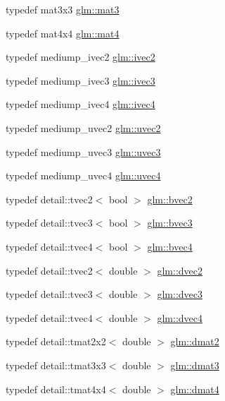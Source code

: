 \begin{DoxyCompactItemize}
\item 
typedef mat3x3 \hyperlink{group__core__types_gadfaff2a7dce5cbf4e77a47ecea42ac5b}{glm\-::mat3}
\item 
typedef mat4x4 \hyperlink{group__core__types_ga7dcd2365c2e368e6af5b7adeb6a9c8df}{glm\-::mat4}
\item 
typedef mediump\-\_\-ivec2 \hyperlink{group__core__types_ga606b9d298d8aaa55c449182c340b4622}{glm\-::ivec2}
\item 
typedef mediump\-\_\-ivec3 \hyperlink{group__core__types_ga620442eba2e3b49317b24fd6d141b0f8}{glm\-::ivec3}
\item 
typedef mediump\-\_\-ivec4 \hyperlink{group__core__types_ga997dbad029105eea19ccd8a1455a6fe3}{glm\-::ivec4}
\item 
typedef mediump\-\_\-uvec2 \hyperlink{group__core__types_gad0643cb47b927024ccf4979b0e9a903d}{glm\-::uvec2}
\item 
typedef mediump\-\_\-uvec3 \hyperlink{group__core__types_ga713379218af0a01d0a7b1e631066106c}{glm\-::uvec3}
\item 
typedef mediump\-\_\-uvec4 \hyperlink{group__core__types_gae85130f09c272fcd64da1353c09dddef}{glm\-::uvec4}
\item 
typedef detail\-::tvec2$<$ bool $>$ \hyperlink{group__core__types_ga0b5729ae4f7b2767a18bb96b7152c072}{glm\-::bvec2}
\item 
typedef detail\-::tvec3$<$ bool $>$ \hyperlink{group__core__types_gac192f5fbd7fcb78ca703d4684f323512}{glm\-::bvec3}
\item 
typedef detail\-::tvec4$<$ bool $>$ \hyperlink{group__core__types_ga8ec34c649bc4513202aff479486bbcea}{glm\-::bvec4}
\item 
typedef detail\-::tvec2$<$ double $>$ \hyperlink{group__core__types_gad9953f484cbb104e8675653ce61900cb}{glm\-::dvec2}
\item 
typedef detail\-::tvec3$<$ double $>$ \hyperlink{group__core__types_ga140a8656fbb8b19382f109c5d5869856}{glm\-::dvec3}
\item 
typedef detail\-::tvec4$<$ double $>$ \hyperlink{group__core__types_ga0127b78c4c51b270b2a2ef848c01b5d9}{glm\-::dvec4}
\item 
typedef detail\-::tmat2x2$<$ double $>$ \hyperlink{group__core__types_gaa53909085d199392937e3933af5410a1}{glm\-::dmat2}
\item 
typedef detail\-::tmat3x3$<$ double $>$ \hyperlink{group__core__types_ga557f8357220829c6a6a3e28640e33507}{glm\-::dmat3}
\item 
typedef detail\-::tmat4x4$<$ double $>$ \hyperlink{group__core__types_ga68b5efb5d529f9031481ef36f9babd96}{glm\-::dmat4}

\end{DoxyCompactItemize}
